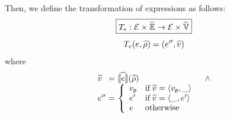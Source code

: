 Then, we define the transformation of expressions as follows:
\[
  \framebox{$\transforme: \exprset \times \aenvset \rightarrow \exprset \times
  \avalset$}
\]
\[
  T_e(e, \widehat{\rho}) = (e'', \widehat{v})
\]
where
\[
  \begin{array}{l@{~}c@{~}ll}
    \aval &=& \asem{\expr}(\aenv) &\wedge\\
    \expr'' &=& \left\{
      \begin{array}{ll}
        \pval & \text{if} \; \aval = \langle \pval, \_ \rangle\\
        \expr' & \text{if} \; \aval = \langle \_, \expr' \rangle\\
        \expr & \text{otherwise}\\
      \end{array}
    \right.\\
  \end{array}
\]

